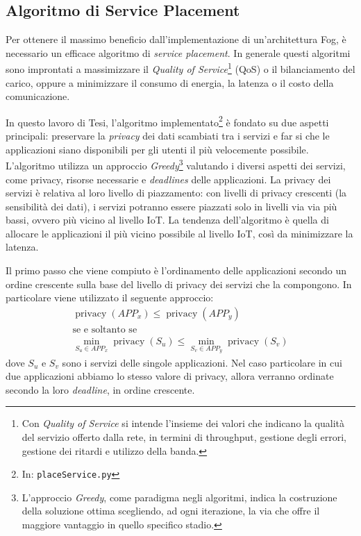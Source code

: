 \subsection{Algoritmo di Service Placement}

Per ottenere il massimo beneficio dall'implementazione di un'architettura Fog, è necessario un efficace algoritmo di \textit{service placement}. In generale questi algoritmi sono improntati a massimizzare il \textit{Quality of Service}\footnote{Con \textit{Quality of Service} si intende l'insieme dei valori che indicano la qualità del servizio offerto dalla rete, in termini di throughput, gestione degli errori, gestione dei ritardi e utilizzo della banda.} (QoS) o il bilanciamento del carico, oppure a minimizzare il consumo di energia, la latenza o il costo della comunicazione.

In questo lavoro di Tesi, l'algoritmo implementato\footnote{In: \texttt{placeService.py}} è fondato su due aspetti principali: preservare la \textit{privacy} dei dati scambiati tra i servizi e far si che le applicazioni siano disponibili per gli utenti il più velocemente possibile. L'algoritmo utilizza un approccio \textit{Greedy}\footnote{L'approccio \textit{Greedy}, come paradigma negli algoritmi, indica la costruzione della soluzione ottima scegliendo, ad ogni iterazione, la via che offre il maggiore vantaggio in quello specifico stadio. } valutando i diversi aspetti dei servizi, come privacy, risorse necessarie e \textit{deadlines} delle applicazioni. La privacy dei servizi è relativa al loro livello di piazzamento: con livelli di privacy crescenti (la sensibilità dei dati), i servizi potranno essere piazzati solo in livelli via via più bassi, ovvero più vicino al livello IoT. La tendenza dell'algoritmo è quella di allocare le applicazioni il più vicino possibile al livello IoT, così da minimizzare la latenza.

Il primo passo che viene compiuto è l'ordinamento delle applicazioni secondo un ordine crescente sulla base del livello di privacy dei servizi che la compongono. In particolare viene utilizzato il seguente approccio:
\begin{equation*}  
	\begin{array}{c}

\displaystyle \operatorname{privacy}(APP_x) \leq \operatorname{privacy}(APP_y)\\
\text{se e soltanto se}\\
\displaystyle \min_{S_u \in APP_x} \operatorname{privacy}(S_u) \leq \min_{S_v \in APP_y} \operatorname{privacy}(S_v)
 	\end{array}
\end{equation*}
dove $S_u$ e $S_v$ sono i servizi delle singole applicazioni. Nel caso particolare in cui due applicazioni abbiamo lo stesso valore di privacy, allora verranno ordinate secondo la loro \textit{deadline}, in ordine crescente.

